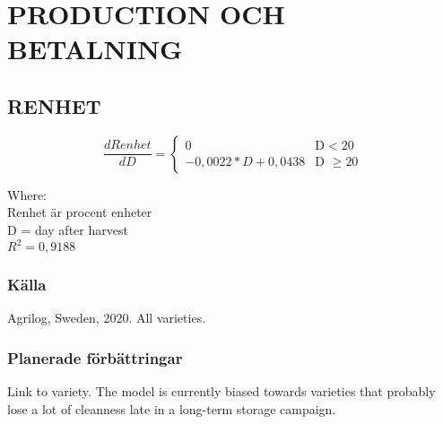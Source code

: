 \documentclass[fleqn]{article}
\begin{document}




\pagebreak
\section{PRODUCTION OCH BETALNING}

  \subsection{RENHET}

  \begin{equation}
    \frac{dRenhet}{dD} =
    \begin{cases}
      0 & \text{D} < 20\\
      -0,0022*D + 0,0438 & \text{D $\geq 20$}
    \end{cases}
  \end{equation}

  Where:\\
  \hangindent=1.5cm
  Renhet är procent enheter\\
  D = day after harvest\\
  $R^2 = 0,9188$

    \subsubsection{Källa}
    Agrilog, Sweden, 2020. All varieties.
    
    \subsubsection{Planerade förbättringar}
    Link to variety. The model is currently biased towards varieties that probably lose a lot of cleanness late in a long-term storage campaign.

\end{document}
